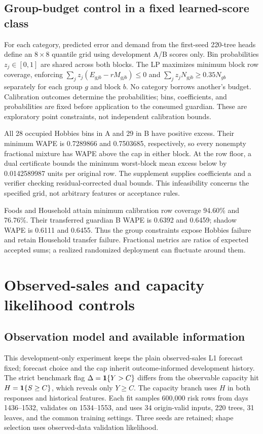 \subsection{Group-budget control in a fixed learned-score class}
\label{app:grouplp}
For each category, predicted error and demand from the first-seed 220-tree heads define an $8\times8$ quantile grid using development A/B scores only. Bin probabilities $z_j\in[0,1]$ are shared across both blocks. The LP maximizes minimum block row coverage, enforcing $\sum_j z_j(E_{gjb}-rM_{gjb})\leq0$ and $\sum_jz_jN_{gjb}\geq0.35N_{gb}$ separately for each group $g$ and block $b$. No category borrows another's budget. Calibration outcomes determine the probabilities; bins, coefficients, and probabilities are fixed before application to the consumed guardian. These are exploratory point constraints, not independent calibration bounds.

All 28 occupied Hobbies bins in A and 29 in B have positive excess. Their minimum WAPE is 0.7289866 and 0.7503685, respectively, so every nonempty fractional mixture has WAPE above the cap in either block. At the row floor, a dual certificate bounds the minimum worst-block mean excess below by 0.0142589987 units per original row. The supplement supplies coefficients and a verifier checking residual-corrected dual bounds. This infeasibility concerns the specified grid, not arbitrary features or acceptance rules.

Foods and Household attain minimum calibration row coverage 94.60\% and 76.76\%. Their transferred guardian B WAPE is 0.6392 and 0.6459; shadow WAPE is 0.6111 and 0.6455. Thus the group constraints expose Hobbies failure and retain Household transfer failure. Fractional metrics are ratios of expected accepted sums; a realized randomized deployment can fluctuate around them.

\section{Observed-sales and capacity likelihood controls}
\label{app:observable}

\subsection{Observation model and available information}
This development-only experiment keeps the plain observed-sales L1 forecast fixed; forecast choice and the cap inherit outcome-informed development history. The strict benchmark flag $\Delta=\mathbf{1}\{Y>C\}$ differs from the observable capacity hit $H=\mathbf{1}\{S\geq C\}$, which reveals only $Y\geq C$. The capacity branch uses $H$ in both responses and historical features. Each fit samples 600,000 risk rows from days 1436--1532, validates on 1534--1553, and uses 34 origin-valid inputs, 220 trees, 31 leaves, and the common training settings. Three seeds are retained; shape selection uses observed-data validation likelihood.

